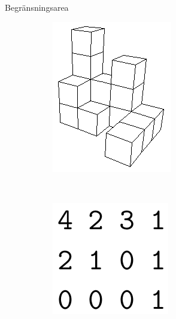 \documentclass[10pt]{beamer}
\begin{document}
\begin{frame}{Begränsningsarea}

\begin{figure}[!ht]
    \centering
    \begin{subfigure}[b]{0.3\textwidth}
        \includegraphics[height=\textwidth]{begransningsarea.png}
        \label{fig:begransningsarea}
    \end{subfigure}
    ~ %
    \begin{subfigure}[b]{0.3\textwidth}
        \includegraphics[height=\textwidth]{begransningsarea_input}

\end{subfigure}
\end{figure}
\end{frame}
\end{document}

